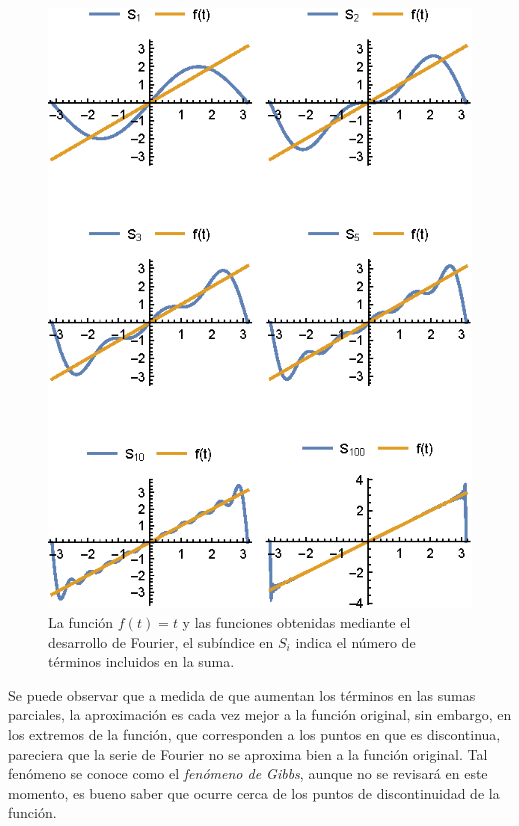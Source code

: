 \begin{figure}[H]
    \centering
    \includegraphics[scale=1.5]{Imagenes/Funciones_Ortogonales_02.eps}
    \caption{La función $f(t) = t$ y las funciones obtenidas mediante el desarrollo de Fourier, el subíndice en $S_{i}$ indica el número de términos incluidos en la suma.}
    \label{fig:06_01_02}
\end{figure}

Se puede observar que a medida de que aumentan los términos en las sumas parciales, la aproximación es cada vez mejor a la función original, sin embargo, en los extremos de la función, que corresponden a los puntos en que es discontinua, pareciera que la serie de Fourier no se aproxima bien a la función original. Tal fenómeno se conoce como el \emph{fenómeno de Gibbs}, aunque no se revisará en este momento, es bueno saber que ocurre cerca de los puntos de discontinuidad de la función.

